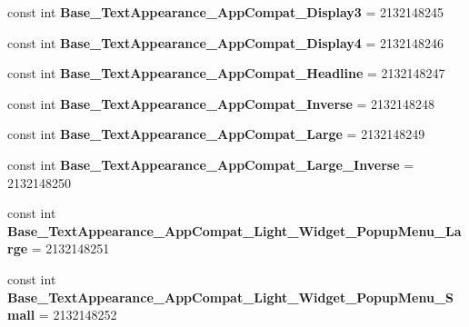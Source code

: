 \begin{DoxyCompactItemize}
\item 
\mbox{\label{classst_delivery_1_1_resource_1_1_style_a15758dc1b74ff16012e23f8cc2dadcf2}} 
const int {\bfseries Base\+\_\+\+Text\+Appearance\+\_\+\+App\+Compat\+\_\+\+Display3} = 2132148245
\item 
\mbox{\label{classst_delivery_1_1_resource_1_1_style_a9064e2360efcee4d5f5ed05e44524238}} 
const int {\bfseries Base\+\_\+\+Text\+Appearance\+\_\+\+App\+Compat\+\_\+\+Display4} = 2132148246
\item 
\mbox{\label{classst_delivery_1_1_resource_1_1_style_a1abc14c60164d42b3b2c925d6b6eac29}} 
const int {\bfseries Base\+\_\+\+Text\+Appearance\+\_\+\+App\+Compat\+\_\+\+Headline} = 2132148247
\item 
\mbox{\label{classst_delivery_1_1_resource_1_1_style_abf3436b482f8ebf7a1037310b4b5604f}} 
const int {\bfseries Base\+\_\+\+Text\+Appearance\+\_\+\+App\+Compat\+\_\+\+Inverse} = 2132148248
\item 
\mbox{\label{classst_delivery_1_1_resource_1_1_style_aae021ca28771557ba39e07652bd506af}} 
const int {\bfseries Base\+\_\+\+Text\+Appearance\+\_\+\+App\+Compat\+\_\+\+Large} = 2132148249
\item 
\mbox{\label{classst_delivery_1_1_resource_1_1_style_ade7e4788ac4d1557830665fa4f8db6a1}} 
const int {\bfseries Base\+\_\+\+Text\+Appearance\+\_\+\+App\+Compat\+\_\+\+Large\+\_\+\+Inverse} = 2132148250
\item 
\mbox{\label{classst_delivery_1_1_resource_1_1_style_af9bedef985aecc2db97556f938f7f632}} 
const int {\bfseries Base\+\_\+\+Text\+Appearance\+\_\+\+App\+Compat\+\_\+\+Light\+\_\+\+Widget\+\_\+\+Popup\+Menu\+\_\+\+Large} = 2132148251
\item 
\mbox{\label{classst_delivery_1_1_resource_1_1_style_a0e0d96979220f9e609f505253154013e}} 
const int {\bfseries Base\+\_\+\+Text\+Appearance\+\_\+\+App\+Compat\+\_\+\+Light\+\_\+\+Widget\+\_\+\+Popup\+Menu\+\_\+\+Small} = 2132148252

\end{DoxyCompactItemize}
